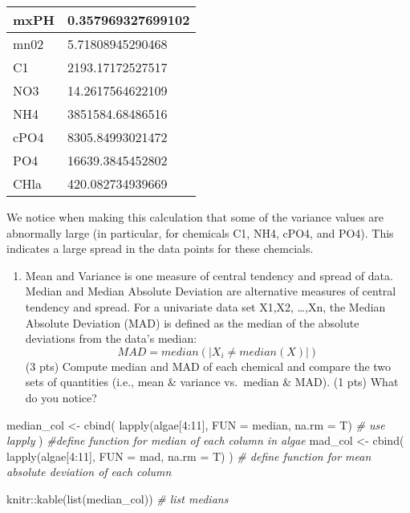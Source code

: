 \documentclass[
]{article}
\newenvironment{Shaded}{\begin{snugshade}}{\end{snugshade}}
\newcommand{\AttributeTok}[1]{\textcolor[rgb]{0.77,0.63,0.00}{#1}}
\newcommand{\CommentTok}[1]{\textcolor[rgb]{0.56,0.35,0.01}{\textit{#1}}}
\newcommand{\DecValTok}[1]{\textcolor[rgb]{0.00,0.00,0.81}{#1}}
\newcommand{\FunctionTok}[1]{\textcolor[rgb]{0.00,0.00,0.00}{#1}}
\newcommand{\NormalTok}[1]{#1}
\newcommand{\OtherTok}[1]{\textcolor[rgb]{0.56,0.35,0.01}{#1}}
\newcommand{\SpecialCharTok}[1]{\textcolor[rgb]{0.00,0.00,0.00}{#1}}
\providecommand{\tightlist}{%
  \setlength{\itemsep}{0pt}\setlength{\parskip}{0pt}}
\begin{document}
\begin{table}

\centering
\begin{tabular}[t]{l|l}
\hline
mxPH & 0.357969327699102\\
\hline
mn02 & 5.71808945290468\\
\hline
C1 & 2193.17172527517\\
\hline
NO3 & 14.2617564622109\\
\hline
NH4 & 3851584.68486516\\
\hline
cPO4 & 8305.84993021472\\
\hline
PO4 & 16639.3845452802\\
\hline
CHla & 420.082734939669\\
\hline
\end{tabular}
\end{table}

We notice when making this calculation that some of the variance values
are abnormally large (in particular, for chemicals C1, NH4, cPO4, and
PO4). This indicates a large spread in the data points for these
chemcials.

\begin{enumerate}
\def\labelenumi{\alph{enumi}.}
\setcounter{enumi}{2}
\tightlist
\item
  Mean and Variance is one measure of central tendency and spread of
  data. Median and Median Absolute Deviation are alternative measures of
  central tendency and spread. For a univariate data set X1,X2,
  \ldots,Xn, the Median Absolute Deviation (MAD) is defined as the
  median of the absolute deviations from the data's median:
  \[MAD = median(|X_i ≠ median(X)|)\] (3 pts) Compute median and MAD of
  each chemical and compare the two sets of quantities (i.e., mean \&
  variance vs.~median \& MAD). (1 pts) What do you notice?
\end{enumerate}

\begin{Shaded}
\begin{Highlighting}[]
\NormalTok{median\_col }\OtherTok{\textless{}{-}} \FunctionTok{cbind}\NormalTok{(}
  \FunctionTok{lapply}\NormalTok{(algae[}\DecValTok{4}\SpecialCharTok{:}\DecValTok{11}\NormalTok{], }\AttributeTok{FUN =}\NormalTok{ median, }\AttributeTok{na.rm =}\NormalTok{ T) }\CommentTok{\# use lapply}
\NormalTok{) }\CommentTok{\#define function for median of each column in algae}
\NormalTok{mad\_col }\OtherTok{\textless{}{-}} \FunctionTok{cbind}\NormalTok{( }
  \FunctionTok{lapply}\NormalTok{(algae[}\DecValTok{4}\SpecialCharTok{:}\DecValTok{11}\NormalTok{], }\AttributeTok{FUN =}\NormalTok{ mad, }\AttributeTok{na.rm =}\NormalTok{ T)}
\NormalTok{) }\CommentTok{\# define function for mean absolute deviation of each column}

\NormalTok{knitr}\SpecialCharTok{::}\FunctionTok{kable}\NormalTok{(}\FunctionTok{list}\NormalTok{(median\_col)) }\CommentTok{\# list medians}
\end{Highlighting}
\end{Shaded}
\end{document}
